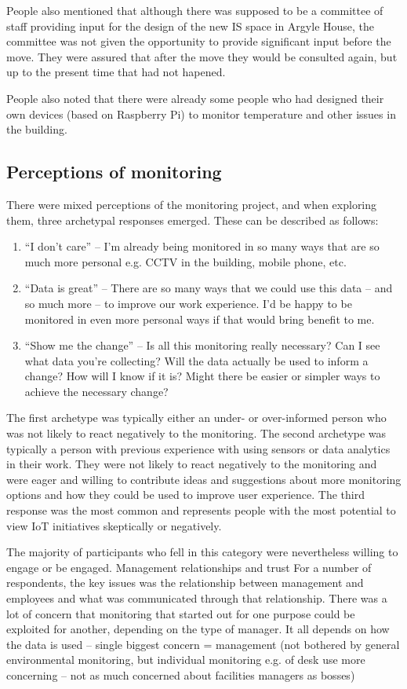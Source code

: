People also mentioned that although there was supposed to be a committee of staff providing input for the design of the new IS space in Argyle House, the committee was not given the opportunity to provide significant input before the move. They were assured that after the move they would be consulted again, but up to the present time that had not hapened. 

People also noted that there were already some people who had designed their own devices (based on Raspberry Pi) to monitor temperature and other issues in the building.

\subsection{Perceptions of monitoring}
\label{sec:perc-monit}

There were mixed perceptions of the monitoring project, and when exploring them, three archetypal responses emerged. These can be described as follows:

\begin{enumerate}
\item “I don’t care” – I’m already being monitored in so many ways that are so much more personal e.g. CCTV in the building, mobile phone, etc.
\item “Data is great” – There are so many ways that we could use this data – and so much more – to improve our work experience. I’d be happy to be monitored in even more personal ways if that would bring benefit to me.
\item “Show me the change” – Is all this monitoring really necessary? Can I see what data you’re collecting? Will the data actually be used to inform a change? How will I know if it is? Might there be easier or simpler ways to achieve the necessary change?
\end{enumerate}

The first archetype was typically either an under- or over-informed person who was not likely to react negatively to the monitoring. The second archetype was typically a person with previous experience with using sensors or data analytics in their work. They were not likely to react negatively to the monitoring and were eager and willing to contribute ideas and suggestions about more monitoring options and how they could be used to improve user experience. The third response was the most common and represents people with the most potential to view IoT initiatives skeptically or negatively. 

The majority of participants who fell in this category were nevertheless willing to engage or be engaged.  Management relationships and trust For a number of respondents, the key issues was the relationship between management and employees and what was communicated through that relationship. There was a lot of concern that monitoring that started out for one purpose could be exploited for another, depending on the type of manager.  It all depends on how the data is used – single biggest concern = management (not bothered by general environmental monitoring, but individual monitoring e.g. of desk use more concerning – not as much concerned about facilities managers as bosses)
